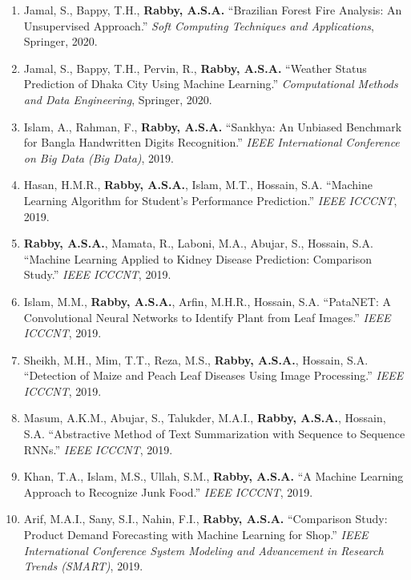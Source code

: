 \documentclass[11pt]{article}
\begin{document}
\begin{enumerate}
    \item Jamal, S., Bappy, T.H., \textbf{Rabby, A.S.A.} ``Brazilian Forest Fire Analysis: An Unsupervised Approach.'' \textit{Soft Computing Techniques and Applications}, Springer, 2020.
    
    \item Jamal, S., Bappy, T.H., Pervin, R., \textbf{Rabby, A.S.A.} ``Weather Status Prediction of Dhaka City Using Machine Learning.'' \textit{Computational Methods and Data Engineering}, Springer, 2020.

    \item Islam, A., Rahman, F., \textbf{Rabby, A.S.A.} ``Sankhya: An Unbiased Benchmark for Bangla Handwritten Digits Recognition.'' \textit{IEEE International Conference on Big Data (Big Data)}, 2019.
    
    \item Hasan, H.M.R., \textbf{Rabby, A.S.A.}, Islam, M.T., Hossain, S.A. ``Machine Learning Algorithm for Student's Performance Prediction.'' \textit{IEEE ICCCNT}, 2019.
    
    \item \textbf{Rabby, A.S.A.}, Mamata, R., Laboni, M.A., Abujar, S., Hossain, S.A. ``Machine Learning Applied to Kidney Disease Prediction: Comparison Study.'' \textit{IEEE ICCCNT}, 2019.
    
    \item Islam, M.M., \textbf{Rabby, A.S.A.}, Arfin, M.H.R., Hossain, S.A. ``PataNET: A Convolutional Neural Networks to Identify Plant from Leaf Images.'' \textit{IEEE ICCCNT}, 2019.
    
    \item Sheikh, M.H., Mim, T.T., Reza, M.S., \textbf{Rabby, A.S.A.}, Hossain, S.A. ``Detection of Maize and Peach Leaf Diseases Using Image Processing.'' \textit{IEEE ICCCNT}, 2019.
    
    \item Masum, A.K.M., Abujar, S., Talukder, M.A.I., \textbf{Rabby, A.S.A.}, Hossain, S.A. ``Abstractive Method of Text Summarization with Sequence to Sequence RNNs.'' \textit{IEEE ICCCNT}, 2019.
    
    \item Khan, T.A., Islam, M.S., Ullah, S.M., \textbf{Rabby, A.S.A.} ``A Machine Learning Approach to Recognize Junk Food.'' \textit{IEEE ICCCNT}, 2019.
    
    \item Arif, M.A.I., Sany, S.I., Nahin, F.I., \textbf{Rabby, A.S.A.} ``Comparison Study: Product Demand Forecasting with Machine Learning for Shop.'' \textit{IEEE International Conference System Modeling and Advancement in Research Trends (SMART)}, 2019.
    

\end{enumerate}
\end{document}
